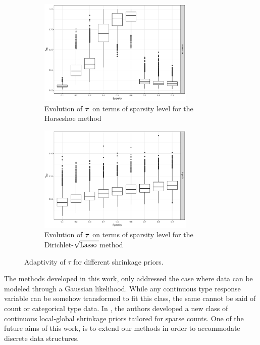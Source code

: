 \documentclass[ba]{imsart}
\def\sqdl{Dirichlet-$\sqrt{\text{\rm{Lasso} }}$}
\begin{document}
\begin{figure}[ht!]%
\begin{subfigure}{0.48\linewidth}
\centering
\includegraphics[height=2in]{Tau_hs}\caption{Evolution of $\boldsymbol{\tau}$ on terms of sparsity level for the Horseshoe method}
\label{fig:tau-hs}
\end{subfigure}
\begin{subfigure}{0.48\linewidth}
\centering
\includegraphics[height=2in]{Tau_dl}\caption{Evolution of $\boldsymbol{\tau}$ on terms of sparsity level for the \sqdl method}
\label{fig:tau-dl}
\end{subfigure}
\caption{Adaptivity of $\tau$ for different shrinkage priors.}%
\label{fig:tau}%
\end{figure}

The methods developed in this work, only addressed the case where data can be modeled through a Gaussian likelihood. While any continuous type response variable can be somehow transformed to fit this class, the same cannot be said of count or categorical type data. In \citep{datta2016bayesian}, the authors developed a new class of continuous local-global shrinkage priors tailored for
sparse counts. One of the future aims of this work, is to extend our methods in order to accommodate discrete data structures. 

\end{document}
